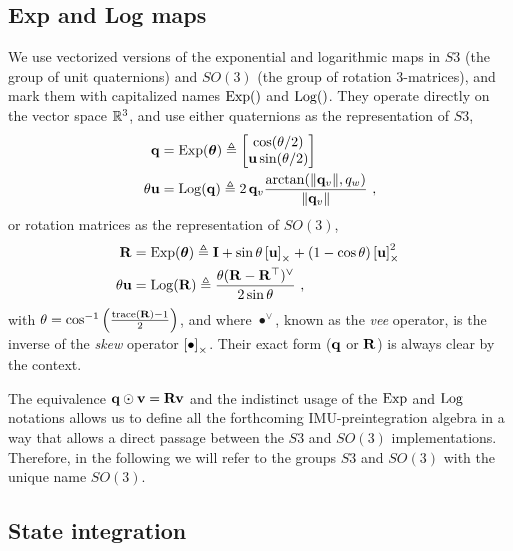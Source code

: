 \subsection{Exp and Log maps}

We use vectorized versions of the exponential and logarithmic maps in $S3$ (the group of unit quaternions) and $SO(3)$ (the group of rotation 3-matrices), and mark them with capitalized names $\operatorname*{Exp}()$ and $\operatorname*{Log}()$. They operate directly on the vector space ${\mathbb R}^3$, and use either quaternions as the representation of $S3$,
%
\begin{subequations}
\begin{align}
{\bf q}
&= \operatorname*{Exp}({{\bm \theta}}) \triangleq \begin{bmatrix}
\cos(\theta/2) \\ {\bf u}\sin(\theta/2)
\end{bmatrix}\\ 
\theta{\bf u} &= \operatorname*{Log}({\bf q}) \triangleq 2\,{{\bf q}_v}\frac{\arctan({{\left\|{{\bf q}_v}\right\|},q_w})}{{\left\|{{\bf q}_v}\right\|}}
~,
\end{align}
\end{subequations}
%
or rotation matrices as the representation of $SO(3)$, 
%
\begin{subequations}
\begin{align}
{\bf R}
&= \operatorname*{Exp}({{\bm \theta}}) \triangleq {\bf I} + \sin\theta\left[{\bf u}\right]_\times + (1-\cos\theta)\left[{\bf u}\right]_\times^2~ \label{equ:rodrigues} \\ 
\theta{\bf u} &= \operatorname*{Log}({\bf R}) \triangleq \frac{\theta({\bf R}-{\bf R}^{\top})^\vee}{2\sin\theta} 
~,
\end{align}
\end{subequations}
%
with $\theta=\cos^{-1}\left(\frac{\operatorname*{trace}({\bf R})-1}{2}\right)$,
and where $\bullet^\vee$, known as the \emph{vee} operator, is the inverse of the \emph{skew} operator $\left[\bullet\right]_\times$. 
Their exact form (${\bf q}$ or ${\bf R}$) is always clear by the context.

The equivalence ${\bf q}\odot{\bf v}={\bf R}{\bf v}$ and the indistinct usage of the $\operatorname*{Exp}$ and $\operatorname*{Log}$ notations allows us to define all the forthcoming IMU-preintegration algebra in a way that allows a direct passage between the $S3$ and $SO(3)$ implementations.
Therefore, in the following we will refer to the groups $S3$ and $SO(3)$ with the unique name $SO(3)$. 





\subsection{State integration}

